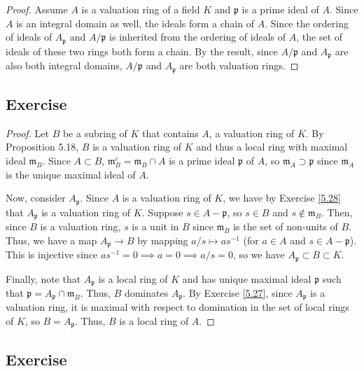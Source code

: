 \begin{proof}
Assume $A$ is a valuation ring of a field $K$ and $\mathfrak{p}$ is a prime ideal of $A$. Since $A$ is an integral domain as well, the ideals form a 
chain of $A$. Since the ordering of ideals of $A_{\mathfrak{p}}$ and $A/\mathfrak{p}$ is inherited from the ordering of ideals of $A$, the set of ideals
of these two rings both form a chain. By the result, since $A/\mathfrak{p}$ and $A_{\mathfrak{p}}$ are also both integral domains, $A/\mathfrak{p}$ and 
$A_{\mathfrak{p}}$ are both valuation rings.
\end{proof}

\subsection{Exercise}\label{5.29}

\begin{proof}
Let $B$ be a subring of $K$ that contains $A$, a valuation ring of $K$. By Proposition 5.18, $B$ is a valuation ring of $K$ and thus a local ring
with maximal ideal $\mathfrak{m}_B$. Since $A \subset B$, $\mathfrak{m}_B^c = \mathfrak{m}_B \cap A$ is a prime ideal $\mathfrak{p}$ of $A$, so 
$\mathfrak{m}_A \supset \mathfrak{p}$ since $\mathfrak{m}_A$ is the unique maximal ideal of $A$.

Now, consider $A_{\mathfrak{p}}$. Since $A$ is a valuation ring of $K$, we have by Exercise \ref{5.28} that $A_{\mathfrak{p}}$ is a valuation ring
of $K$. Suppose $s \in A - \mathfrak{p}$, so $s \in B$ and $s \not\in \mathfrak{m}_B$. Then, since $B$ is a valuation ring, $s$ is a unit in $B$
since $\mathfrak{m}_B$ is the set of non-units of $B$. Thus, we have a map $A_{\mathfrak{p}} \to B$ by mapping $a/s \mapsto a s^{-1}$ 
(for $a \in A$ and $s \in A - \mathfrak{p}$). This is injective since $a s^{-1} = 0 \implies a = 0 \implies a/s = 0$, so we have
$A_{\mathfrak{p}} \subset B \subset K$.

Finally, note that $A_{\mathfrak{p}}$ is a local ring of $K$ and has unique maximal ideal $\mathfrak{p}$ such that 
$\mathfrak{p} = A_{\mathfrak{p}} \cap \mathfrak{m}_B$. Thus, $B$ dominates $A_{\mathfrak{p}}$. By Exercise \ref{5.27},
since $A_{\mathfrak{p}}$ is a valuation ring, it is maximal with respect to domination in the set of local rings of $K$,
so $B = A_{\mathfrak{p}}$. Thus, $B$ is a local ring of $A$.
\end{proof}

\subsection{Exercise}\label{5.30}

